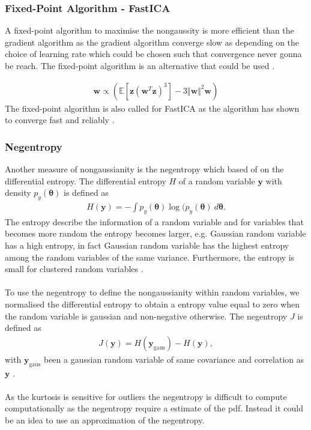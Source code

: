 \subsubsection*{Fixed-Point Algorithm - FastICA}
A fixed-point algorithm to maximise the nongaussity is more efficient than the gradient algorithm as the gradient algorithm converge slow as depending on the choice of learning rate which could be chosen such that convergence never gonna be reach. The fixed-point algorithm is an alternative that could be used .

\begin{align*}
\mathbf{w} \propto ( \mathbb{E}[\mathbf{z}(\mathbf{w}^T \mathbf{z})^3] - 3 \Vert \mathbf{w} \Vert^2 \mathbf{w})
\end{align*}
The fixed-point algorithm is also called for FastICA as the algorithm has shown to converge fast and reliably \cite[p. 179]{ICA}. 


\subsubsection{Negentropy}
Another measure of nongaussianity is the negentropy which based of on the differential entropy. The differential entropy $H$ of a random variable $\mathbf{y}$ with density $p_y (\boldsymbol{\theta})$ is defined as
\begin{align*}
H(\mathbf{y}) = - \int p_y (\boldsymbol{\theta}) \log (p_y (\boldsymbol{\theta}) \ d\boldsymbol{\theta}.
\end{align*}
The entropy describe the information of a random variable and for variables that becomes more random the entropy becomes larger, e.g. Gaussian random variable has a high entropy, in fact Gaussian random variable has the highest entropy among the random variables of the same variance. Furthermore, the entropy is small for clustered random variables \cite[p. 182]{ICA}.
\\ \\
To use the negentropy to define the nongaussianity within random variables, we normalised the differential entropy to obtain a entropy value equal to zero when the random variable is gaussian and non-negative otherwise. The negentropy $J$ is defined as 
\begin{align*}
J(\mathbf{y}) = H(\mathbf{y}_{\text{gaus}}) - H(\mathbf{y}),
\end{align*}
with $\mathbf{y}_{\text{gaus}}$ been a gaussian random variable of same covariance and correlation as $\mathbf{y}$ \cite[p. 182]{ICA}.
\\ \\
As the kurtosis is sensitive for outliers the negentropy is difficult to compute computationally as the negentropy require a estimate of the pdf. Instead it could be an idea to use an approximation of the negentropy.
 
